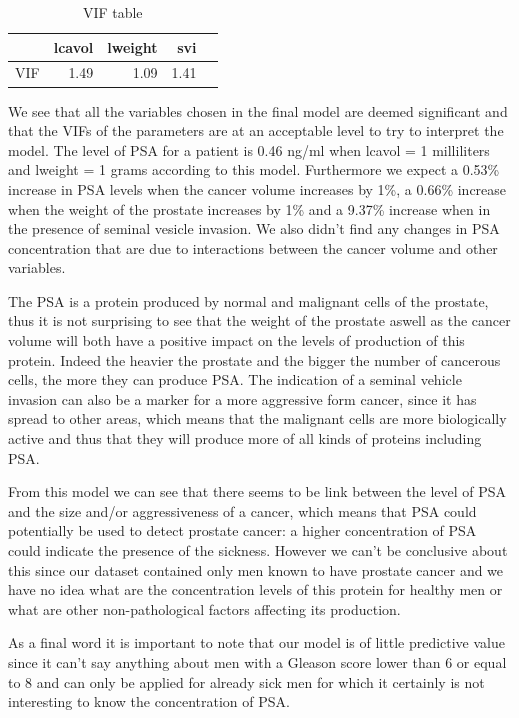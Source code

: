 \documentclass[10pt]{article}
\begin{document}
\begin{table}[ht]
\centering
\caption{VIF table} \label{summary1}
\begin{tabular}{rrrrr}
  \hline
 & lcavol & lweight & svi \\ 
  \hline
VIF & 1.49 & 1.09 & 1.41 \\ 
   \hline
\end{tabular}
\end{table}

We see that all the variables chosen in the final model are deemed significant and that the VIFs of the parameters are at an acceptable level to try to interpret the model. The level of PSA for a patient is 0.46 ng/ml when lcavol = 1 milliliters and lweight = 1 grams according to this model. Furthermore we expect a 0.53\% increase in PSA levels when the cancer volume increases by 1\%, a 0.66\% increase when the weight of the prostate increases by 1\% and a 9.37\%  increase when in the presence of seminal vesicle invasion. We also didn't find any changes in PSA concentration that are due to interactions between the cancer volume and other variables.

The PSA is a protein produced by normal and malignant cells of the prostate, thus it is not surprising to see that the weight of the prostate aswell as the cancer volume will both have a positive impact on the levels of production of this protein. Indeed the heavier the prostate and the bigger the number of cancerous cells, the more they can produce PSA. The indication of a seminal vehicle invasion can also be a marker for a more aggressive form cancer, since it has spread to other areas, which means that the malignant cells are more biologically active and thus that they will produce more of all kinds of proteins including PSA.

From this model we can see that there seems to be link between the level of PSA and the size and/or aggressiveness of a cancer, which means that PSA could potentially be used to detect prostate cancer: a higher concentration of PSA could indicate the presence of the sickness. However we can't be conclusive about this since our dataset contained only men known to have prostate cancer and we have no idea what are the concentration levels of this protein for healthy men or what are other non-pathological factors affecting its production.

As a final word it is important to note that our model is of little predictive value since it can't say anything about men with a Gleason score lower than 6 or equal to 8 and can only be applied for already sick men for which it certainly is not interesting to know the concentration of PSA.
\end{document}
